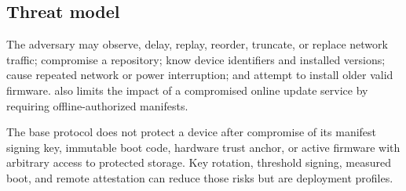 \subsection{Threat model}

The adversary may observe, delay, replay, reorder, truncate, or replace network
traffic; compromise a repository; know device identifiers and installed versions;
cause repeated network or power interruption; and attempt to install older valid
firmware. \protocol also limits the impact of a compromised online update service
by requiring offline-authorized manifests.

The base protocol does not protect a device after compromise of its manifest
signing key, immutable boot code, hardware trust anchor, or active firmware with
arbitrary access to protected storage. Key rotation, threshold signing, measured
boot, and remote attestation can reduce those risks but are deployment profiles.


